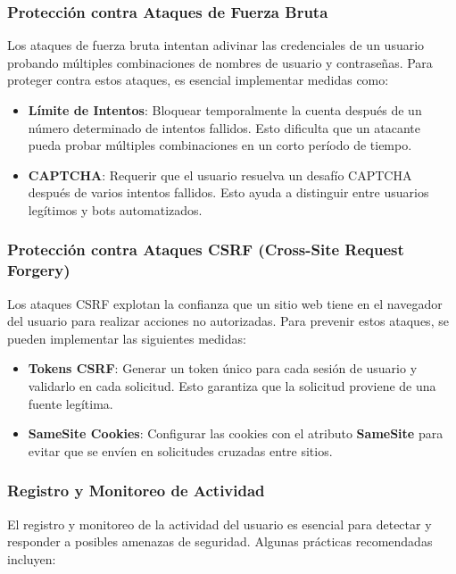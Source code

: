 \documentclass[draft]{scrbook}
\begin{document}
\subsubsection{Protección contra Ataques de Fuerza Bruta}

Los ataques de fuerza bruta intentan adivinar las credenciales de un usuario probando múltiples combinaciones de nombres de usuario y contraseñas. Para proteger contra estos ataques, es esencial implementar medidas como:

\begin{itemize}
    \item \textbf{Límite de Intentos}: Bloquear temporalmente la cuenta después de un número determinado de intentos fallidos. Esto dificulta que un atacante pueda probar múltiples combinaciones en un corto período de tiempo.
    \item \textbf{CAPTCHA}: Requerir que el usuario resuelva un desafío CAPTCHA después de varios intentos fallidos. Esto ayuda a distinguir entre usuarios legítimos y bots automatizados.
\end{itemize}

\subsubsection{Protección contra Ataques CSRF (Cross-Site Request Forgery)}

Los ataques CSRF explotan la confianza que un sitio web tiene en el navegador del usuario para realizar acciones no autorizadas. Para prevenir estos ataques, se pueden implementar las siguientes medidas:

\begin{itemize}
    \item \textbf{Tokens CSRF}: Generar un token único para cada sesión de usuario y validarlo en cada solicitud. Esto garantiza que la solicitud proviene de una fuente legítima.
    \item \textbf{SameSite Cookies}: Configurar las cookies con el atributo \textbf{SameSite} para evitar que se envíen en solicitudes cruzadas entre sitios.
\end{itemize}

\subsubsection{Registro y Monitoreo de Actividad}

El registro y monitoreo de la actividad del usuario es esencial para detectar y responder a posibles amenazas de seguridad. Algunas prácticas recomendadas incluyen:
\end{document}
